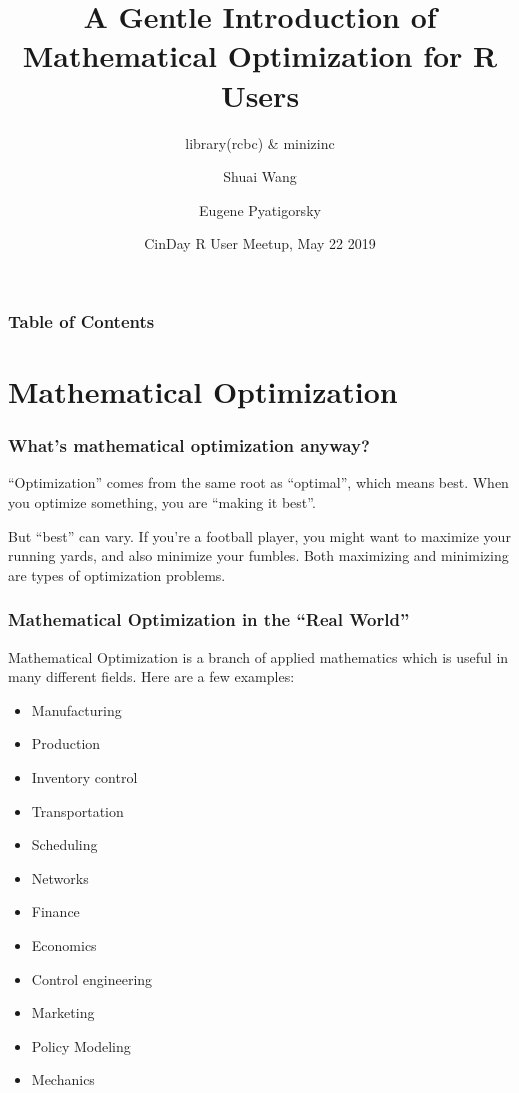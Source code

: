 \documentclass[xcolor=dvipsnames,aspectratio=169]{beamer}
\title[]{A Gentle Introduction of Mathematical Optimization for R Users}
\subtitle{library(rcbc) \& minizinc}
\author[]{Shuai Wang \and Eugene Pyatigorsky}
\institute[] %
{84.51 Operations Research}
\date[] %
{CinDay R User Meetup, May 22 2019}
\begin{document}
\frame{\titlepage}


\begin{frame}
\frametitle{Table of Contents}
\tableofcontents
\end{frame}


\section{Mathematical Optimization}

\begin{frame}
\frametitle{What's mathematical optimization anyway?}
“Optimization” comes from the same root as “optimal”, which means best. When you
optimize something, you are “making it best”.


But “best” can vary. If you’re a football player, you might want to maximize your
running yards, and also minimize your fumbles. Both maximizing and minimizing are types
of optimization problems.
\end{frame}



\begin{frame}
\frametitle{Mathematical Optimization in the “Real World”}
Mathematical Optimization is a branch of applied mathematics which is useful in many different fields. Here are a few examples:
 \begin{multicols}{2}
    \begin{itemize}
        \item Manufacturing
        \item Production
        \item Inventory control
        \item Transportation
        \item Scheduling
        \item Networks
        \item Finance
        \item Economics
        \item Control engineering
        \item Marketing
        \item Policy Modeling
        \item Mechanics
    \end{itemize}
    \end{multicols}

\end{frame}
\end{document}
